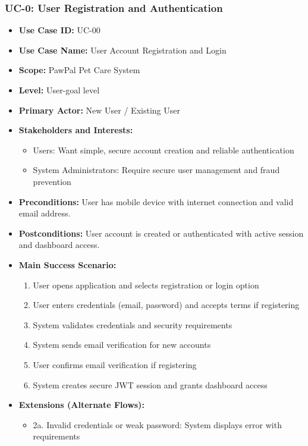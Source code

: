 \subsubsection*{UC-0: User Registration and Authentication}
\begin{itemize}
    \item \textbf{Use Case ID:} UC-00
    \item \textbf{Use Case Name:} User Account Registration and Login
    \item \textbf{Scope:} PawPal Pet Care System
    \item \textbf{Level:} User-goal level
    \item \textbf{Primary Actor:} New User / Existing User
    \item \textbf{Stakeholders and Interests:}
    \begin{itemize}
        \item Users: Want simple, secure account creation and reliable authentication
        \item System Administrators: Require secure user management and fraud prevention
    \end{itemize}
    \item \textbf{Preconditions:} User has mobile device with internet connection and valid email address.
    \item \textbf{Postconditions:} User account is created or authenticated with active session and dashboard access.
    \item \textbf{Main Success Scenario:}
    \begin{enumerate}
        \item User opens application and selects registration or login option
        \item User enters credentials (email, password) and accepts terms if registering
        \item System validates credentials and security requirements
        \item System sends email verification for new accounts
        \item User confirms email verification if registering
        \item System creates secure JWT session and grants dashboard access
    \end{enumerate}
    \item \textbf{Extensions (Alternate Flows):}
    \begin{itemize}
        \item 2a. Invalid credentials or weak password: System displays error with requirements

\end{itemize}
\end{itemize}
